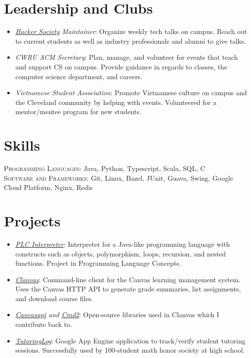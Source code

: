 \documentclass[a4paper,11pt]{article}
\begin{document}
\section{Leadership and Clubs}
\begin{itemize}[noitemsep]
	\item \emph{\href{http://hacsoc.org}{Hacker Society} Maintainer}: Organize weekly tech talks on campus. Reach out to current students as well as industry professionals and alumni to give talks.
	\item \emph{CWRU ACM Secretary}: Plan, manage, and volunteer for events that teach and support CS on campus. Provide guidance in regards to classes, the computer science department, and careers.
	\item \emph{Vietnamese Student Association}: Promote Vietnamese culture on campus and the Cleveland community by helping with events. Volunteered for a mentor/mentee program for new students.
\end{itemize}
\section{Skills}
\textsc{Programming Languages}: Java, Python, Typescript, Scala, SQL, C \\
\textsc{Software and Frameworks}: Git, Linux, Bazel, JUnit, Guava, Swing, Google Cloud Platform, Nginx, Redis
\section{Projects}
\begin{itemize}
    \item \emph{\href{https://github.com/marklalor/PLCInterpreter}{PLC Interpreter}}: Interpreter for a Java-like programming language with constructs such as objects, polymorphism, loops, recursion, and nested functions. Project in Programming Language Concepts.
    \item \emph{\href{https://github.com/marklalor/clanvas}{Clanvas}}: Command-line client for the Canvas learning management system. Uses the Canvas HTTP API to generate grade summaries, list assignments, and download course files.
    \item \emph{\href{https://github.com/ucfopen/canvasapi}{Canvasapi} and \href{https://github.com/python-cmd2/cmd2}{Cmd2}}: Open-source libraries used in Clanvas which I contribute back to.
    \item \emph{\href{https://github.com/marklalor/Tutoring-Log}{TutoringLog}}: Google App Engine application to track/verify student tutoring sessions. Successfully used by 100-student math honor society at high school.
\end{itemize}
\end{document}
